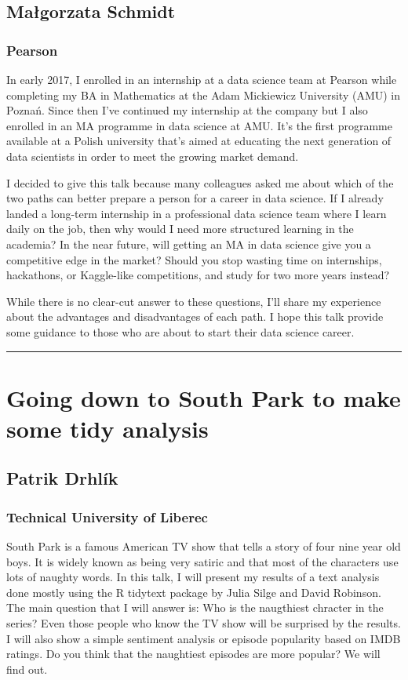 \documentclass [12pt]{article}
\begin{document}
\subsection*{Małgorzata	Schmidt}
\subsubsection*{Pearson}

In early 2017, I enrolled in an internship at a data science team at Pearson while completing my BA in Mathematics at the Adam Mickiewicz University (AMU) in Poznań. Since then I’ve continued my internship at the company but I also enrolled in an MA programme in data science at AMU. It’s the first programme available at a Polish university that’s aimed at educating the next generation of data scientists in order to meet the growing market demand.

I decided to give this talk because many colleagues asked me about which of the two paths can better prepare a person for a career in data science. If I already landed a long-term internship in a professional data science team where I learn daily on the job, then why would I need more structured learning in the academia? In the near future, will getting an MA in data science give you a competitive edge in the market? Should you stop wasting time on internships, hackathons, or Kaggle-like competitions, and study for two more years instead?

While there is no clear-cut answer to these questions, I’ll share my experience about the advantages and disadvantages of each path. I hope this talk provide some guidance to those who are about to start their data science career.

\noindent\rule{\textwidth}{1pt}
\section{Going down to South Park to make some tidy analysis}
\subsection*{Patrik	Drhlík}
\subsubsection*{Technical University of Liberec}

South Park is a famous American TV show that tells a story of four nine year old boys. It is widely known as being very satiric and that most of the characters use lots of naughty words. In this talk, I will present my results of a text analysis done mostly using the R tidytext package by Julia Silge and David Robinson. The main question that I will answer is: Who is the naugthiest chracter in the series? Even those people who know the TV show will be surprised by the results. I will also show a simple sentiment analysis or episode popularity based on IMDB ratings. Do you think that the naughtiest episodes are more popular? We will find out.
\end{document}
